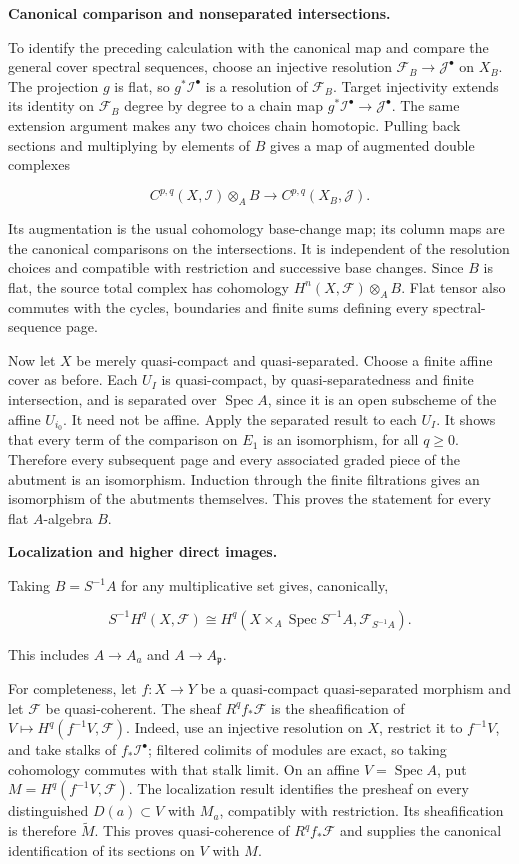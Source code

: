 \documentclass[11pt,a4paper,openany]{report}
\begin{document}
\textbf{Canonical comparison and nonseparated intersections.}

To identify the preceding calculation with the canonical map and compare the general cover spectral sequences, choose an injective resolution \(\mathcal F_B\to\mathcal J^\bullet\) on \(X_B\). The projection \(g\) is flat, so \(g^*\mathcal I^\bullet\) is a resolution of \(\mathcal F_B\). Target injectivity extends its identity on \(\mathcal F_B\) degree by degree to a chain map \(g^*\mathcal I^\bullet\to\mathcal J^\bullet\). The same extension argument makes any two choices chain homotopic. Pulling back sections and multiplying by elements of \(B\) gives a map of augmented double complexes

\[
C^{p,q}(X,\mathcal I)\otimes_A B
\longrightarrow C^{p,q}(X_B,\mathcal J).
\]

Its augmentation is the usual cohomology base-change map; its column maps are the canonical comparisons on the intersections. It is independent of the resolution choices and compatible with restriction and successive base changes. Since \(B\) is flat, the source total complex has cohomology \(H^n(X,\mathcal F)\otimes_A B\). Flat tensor also commutes with the cycles, boundaries and finite sums defining every spectral-sequence page.

Now let \(X\) be merely quasi-compact and quasi-separated. Choose a finite affine cover as before. Each \(U_I\) is quasi-compact, by quasi-separatedness and finite intersection, and is separated over \(\operatorname{Spec}A\), since it is an open subscheme of the affine \(U_{i_0}\). It need not be affine. Apply the separated result to each \(U_I\). It shows that every term of the comparison on \(E_1\) is an isomorphism, for all \(q\geq0\). Therefore every subsequent page and every associated graded piece of the abutment is an isomorphism. Induction through the finite filtrations gives an isomorphism of the abutments themselves. This proves the statement for every flat \(A\)-algebra \(B\).

\textbf{Localization and higher direct images.}

Taking \(B=S^{-1}A\) for any multiplicative set gives, canonically,

\[
S^{-1}H^q(X,\mathcal F)\cong
H^q(X\times_A\operatorname{Spec}S^{-1}A,\mathcal F_{S^{-1}A}).
\]

This includes \(A\to A_a\) and \(A\to A_{\mathfrak p}\).

For completeness, let \(f:X\to Y\) be a quasi-compact quasi-separated morphism and let \(\mathcal F\) be quasi-coherent. The sheaf \(R^qf_*\mathcal F\) is the sheafification of \(V\mapsto H^q(f^{-1}V,\mathcal F)\). Indeed, use an injective resolution on \(X\), restrict it to \(f^{-1}V\), and take stalks of \(f_*\mathcal I^\bullet\); filtered colimits of modules are exact, so taking cohomology commutes with that stalk limit. On an affine \(V=\operatorname{Spec}A\), put \(M=H^q(f^{-1}V,\mathcal F)\). The localization result identifies the presheaf on every distinguished \(D(a)\subset V\) with \(M_a\), compatibly with restriction. Its sheafification is therefore \(\widetilde M\). This proves quasi-coherence of \(R^qf_*\mathcal F\) and supplies the canonical identification of its sections on \(V\) with \(M\).
\end{document}
